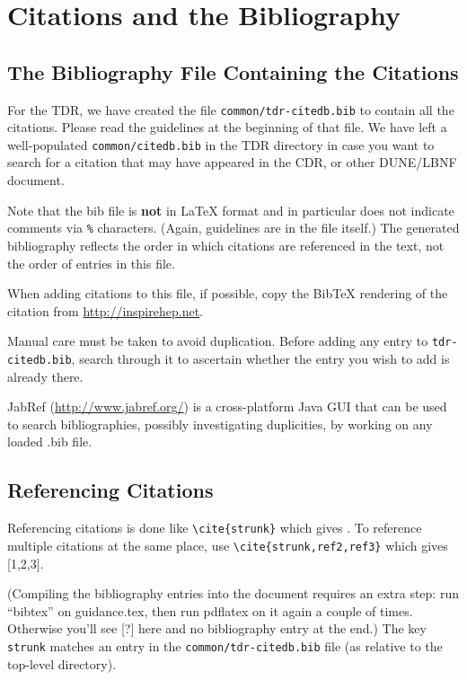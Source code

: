 \section{Citations and the Bibliography}
\label{sec:latex-cit}

\subsection{The Bibliography File Containing the Citations}
\label{sec:latex-bib-file}

For the TDR, we have created the file \texttt{common/tdr-citedb.bib} to contain all the citations. Please read the guidelines at the
beginning of that file. We have left a well-populated \texttt{common/citedb.bib} in the TDR directory in case you want to search for a citation
 that may have appeared in the CDR, or other DUNE/LBNF document.

Note that the bib file is \textbf{not} in \LaTeX{} format and in particular does not
indicate comments via \texttt{\%} characters. (Again, guidelines are in the file itself.)
The
generated bibliography reflects the order in which citations are referenced in the text, not the order of entries in this file.

When adding citations to this file, if possible, copy the BibTeX rendering of the citation from \url{http://inspirehep.net}.

Manual care must be taken to avoid duplication. %
Before adding any entry to \texttt{tdr-citedb.bib}, search through it
to ascertain whether the entry you wish to add is already there.

JabRef (\url{http://www.jabref.org/}) is a cross-platform Java GUI that can be used to search bibliographies, possibly investigating duplicities, by working on any loaded .bib file.

\subsection{Referencing Citations}
\label{sec:latex-ref}

Referencing citations is done like \verb|\cite{strunk}| which gives \cite{strunk}.
To reference multiple citations at the same place, use \verb|\cite{strunk,ref2,ref3}| which gives  [1,2,3].

(Compiling the bibliography entries into the document requires an extra step: run ``bibtex'' on
 guidance.tex, then run pdflatex on it again a couple of times. Otherwise you'll see [?] here 
 and no bibliography entry at the end.) 
The key \texttt{strunk} matches an entry in the \texttt{common/tdr-citedb.bib}
file (as relative to the top-level directory).

